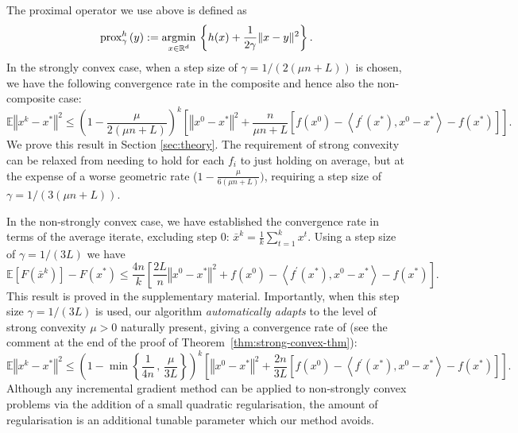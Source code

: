 \documentclass{article}
\newcommand{\argmin}{\operatornamewithlimits{argmin}}
\newcommand{\stepsize}{\gamma} %
\begin{document}
The proximal operator we use above is defined as
\begin{equation}
\text{prox}^{h}_{\stepsize}\left(y\right) := \argmin_{x \in \mathbb{R}^d} \,\left\{ h(x) + \frac{1}{2\stepsize} \Vert x - y \Vert^2 \right\}.
\end{equation}
In the strongly convex case, when a step size of $\stepsize=1/(2(\mu n+L))$ is chosen, we have the following convergence rate in the composite and hence also the non-composite case:
\begingroup\makeatletter\def\f@size{9}\check@mathfonts
\[
\mathbb{E}\left\Vert x^{k}-x^{*}\right\Vert ^{2}\leq\left(1-\frac{\mu}{2(\mu n+L)}\right)^{k}\left[\left\Vert x^{0}-x^{*}\right\Vert ^{2}
+\frac{n}{\mu n + L} \left[f(x^{0}) -\left\langle f^{\prime}(x^{*}),x^{0}-x^{*}\right\rangle  - f(x^{*})\right]\right].
 \]
 \endgroup
We prove this result in Section \ref{sec:theory}. The requirement of strong convexity can be relaxed from needing to hold for each $f_i$ to just holding on average, but at the expense of a worse geometric rate ($1-\frac{\mu}{6(\mu n+L)})$, requiring a step size of $\stepsize=1/(3(\mu n+L))$.

In the non-strongly convex case, we have established the convergence rate in terms of the average iterate, excluding step 0:  $\bar{x}^{k}=\frac{1}{k}\sum_{t=1}^{k}x^{t}$. Using a step size of $\stepsize=1/(3L)$ we have
\[
\mathbb{E}\left[F(\bar{x}^{k})\right]-F(x^{*})\leq\frac{4n}{k}\left[\frac{2L}{n}\left\Vert x^{0}-x^{*}\right\Vert ^{2}
+f(x^{0}) -\left\langle f^{\prime}(x^{*}),x^{0}-x^{*}\right\rangle  -f(x^{*})\right].
\]
This result is proved in the supplementary material. Importantly, when this   step size $\stepsize=1/(3L)$ is used, our algorithm \emph{automatically adapts} to the level of strong convexity $\mu > 0$ naturally present, giving a convergence rate of (see the comment at the end of the proof of Theorem~\ref{thm:strong-convex-thm}):
\begingroup\makeatletter\def\f@size{9}\check@mathfonts
\[
\mathbb{E}\left\Vert x^{k}-x^{*}\right\Vert ^{2}\leq
\left( 1-\min\left\{ \frac{1}{4n}\,,\,\frac{\mu}{3L}\right\} \right)^{k}
\left[\left\Vert x^{0}-x^{*}\right\Vert ^{2}
+\frac{2n}{3L} \left[f(x^{0}) -\left\langle f^{\prime}(x^{*}),x^{0}-x^{*}\right\rangle  -f(x^{*})\right]\right].
 \]
 \endgroup
Although any incremental gradient method can be applied to non-strongly convex problems via the addition of a small quadratic regularisation, the amount of regularisation is an additional tunable parameter which our method avoids.
 
\vspace{-2mm}
\end{document}
